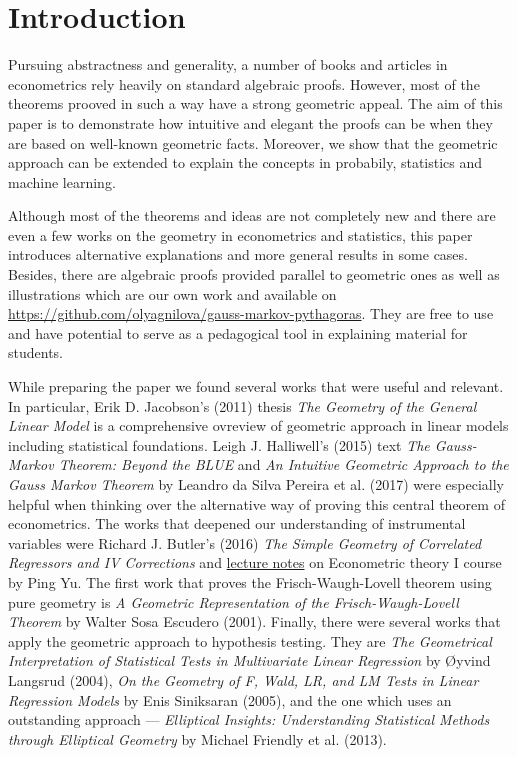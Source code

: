 \section{Introduction}

\begin{fullwidth}

Pursuing abstractness and generality, a number of books and articles in
econometrics rely heavily on standard algebraic proofs.
However, most of the theorems prooved in such a way have a strong geometric appeal.
The aim of this paper is to demonstrate how intuitive and elegant the proofs
can be when they are based on well-known geometric facts.
Moreover, we show that the geometric approach can be extended to explain
the concepts in probabily, statistics and machine learning.

Although most of the theorems and ideas are not completely new and
there are even a few works on the geometry in econometrics and statistics,
this paper introduces alternative explanations and more general results in some cases.
Besides, there are algebraic proofs provided parallel to geometric ones
as well as illustrations which are our own work and available on \url{https://github.com/olyagnilova/gauss-markov-pythagoras}. %
They are free to use and have potential to serve as a pedagogical tool
in explaining material for students.

While preparing the paper we found several works that were useful and relevant.
In particular, Erik D. Jacobson's (2011) thesis \textit{The Geometry of the General Linear Model}
is a comprehensive ovreview of geometric approach in linear models including
statistical foundations.
Leigh J. Halliwell’s (2015) text \textit{The Gauss-Markov Theorem: Beyond the BLUE} and
\textit{An Intuitive Geometric Approach to the Gauss Markov Theorem}
by Leandro da Silva Pereira et al. (2017) were especially helpful when thinking over
the alternative way of proving this central theorem of econometrics.
The works that deepened our understanding of instrumental variables were
Richard J. Butler's (2016) \textit{The Simple Geometry of Correlated Regressors and IV Corrections}
and \href{http://web.hku.hk/~pingyu/6005/6005.htm}{lecture notes} on Econometric theory I course by Ping Yu.
The first work that proves the Frisch-Waugh-Lovell theorem using pure geometry
is \textit{A Geometric Representation of the Frisch-Waugh-Lovell Theorem} by
Walter Sosa Escudero (2001).
Finally, there were several works that apply the geometric approach to
hypothesis testing. They are
\textit{The Geometrical Interpretation of Statistical Tests in Multivariate Linear Regression}
by {\O}yvind Langsrud (2004),
\textit{On the Geometry of F, Wald, LR, and LM Tests in Linear Regression Models}
by Enis Siniksaran (2005),
and the one which uses an outstanding approach —
\textit{Elliptical Insights: Understanding Statistical Methods through Elliptical Geometry}
by Michael Friendly et al. (2013).


\end{fullwidth}
